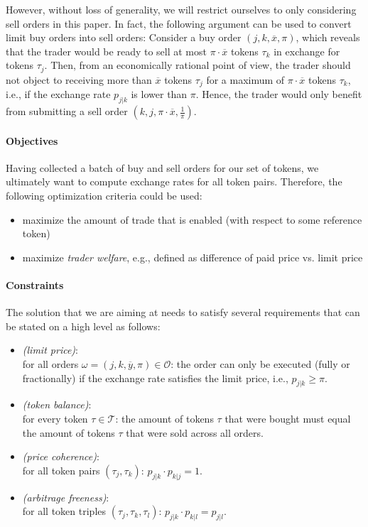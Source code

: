 \documentclass[11pt,parskip=full]{scrartcl}%
\newcommand*{\ie}{i.e., }
\newcommand*{\eg}{e.g., }
\newcommand*{\wrt}{with respect to }
\newcommand*{\tokens}{\mathcal{T}}          %
\newcommand*{\orders}{\mathcal{O}}          %
\begin{document}
However, without loss of generality, we will restrict ourselves to only considering sell orders in
this paper.
In fact, the following argument can be used to convert limit buy orders into sell orders:
Consider a buy order $ (j,k,\overline{x},\pi) $, which reveals that the trader would be ready to
sell at most $ \pi \cdot \overline{x} $ tokens $ \tau_k $ in exchange for tokens $ \tau_j $.
Then, from an economically rational point of view, the trader should not object to receiving more
than $ \overline{x} $ tokens $ \tau_j $ for a maximum of $ \pi \cdot \overline{x} $ tokens
$ \tau_k $, \ie if the exchange rate $ p_{j|k} $ is lower than $ \pi $.
Hence, the trader would only benefit from submitting a sell order
$ (k,j,\pi \cdot \overline{x},\frac{1}{\pi}) $.

\paragraph{Objectives}

Having collected a batch of buy and sell orders for our set of tokens, we ultimately want to
compute exchange rates for all token pairs.
Therefore, the following optimization criteria could be used:
\begin{itemize}
  \item maximize the amount of trade that is enabled (\wrt some reference token)
  \item maximize \emph{trader welfare}, \eg defined as difference of paid price vs. limit price
\end{itemize}


\paragraph{Constraints}

The solution that we are aiming at needs to satisfy several requirements that can be stated on a
high level as follows:
\begin{itemize}
  \item \emph{(limit price)}:\\
  for all orders
  $ \omega = (j,k,\overline{y},\pi) \in \orders $:
  the order can only be executed (fully or fractionally) if the exchange rate satisfies the
  limit price, \ie $ p_{j|k} \ge \pi $.
  \item \emph{(token balance)}:\\
  for every token $ \tau \in \tokens $: the amount of tokens $ \tau $ that were bought must
  equal the amount of tokens $ \tau $ that were sold across all orders.
  \item \emph{(price coherence)}:\\
  for all token pairs $ (\tau_j,\tau_k) $: $ p_{j|k} \cdot p_{k|j} = 1 $.
  \item \emph{(arbitrage freeness)}:\\
  for all token triples $ (\tau_j,\tau_k,\tau_l) $: $ p_{j|k} \cdot p_{k|l} = p_{j|l} $.
\end{itemize}
\end{document}
